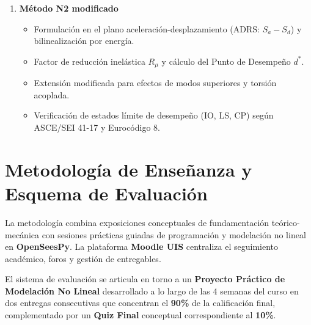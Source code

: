 \documentclass[11pt,letterpaper]{article}
\begin{document}
\begin{enumerate}[leftmargin=18pt, topsep=2pt, itemsep=3.5pt, parsep=0pt, label=\textbf{\arabic*.}]
    \item \textbf{Método N2 modificado}
    \begin{itemize}[leftmargin=12pt, topsep=1pt, itemsep=1pt]
        \item Formulación en el plano aceleración-desplazamiento (ADRS: $S_a - S_d$) y bilinealización por energía.
        \item Factor de reducción inelástica $R_\mu$ y cálculo del Punto de Desempeño $d^*$.
        \item Extensión modificada para efectos de modos superiores y torsión acoplada.
        \item Verificación de estados límite de desempeño (IO, LS, CP) según ASCE/SEI 41-17 y Eurocódigo 8.
    \end{itemize}
\end{enumerate}

\clearpage
\enlargethispage{\baselineskip}


\section{Metodología de Enseñanza y Esquema de Evaluación}

La metodología combina exposiciones conceptuales de fundamentación teórico-mecánica con sesiones prácticas guiadas de programación y modelación no lineal en \textbf{OpenSeesPy}. La plataforma \textbf{Moodle UIS} centraliza el seguimiento académico, foros y gestión de entregables.

El sistema de evaluación se articula en torno a un \textbf{Proyecto Práctico de Modelación No Lineal} desarrollado a lo largo de las 4 semanas del curso en dos entregas consecutivas que concentran el \textbf{90\%} de la calificación final, complementado por un \textbf{Quiz Final} conceptual correspondiente al \textbf{10\%}.

\vspace{0.10cm}
\end{document}
